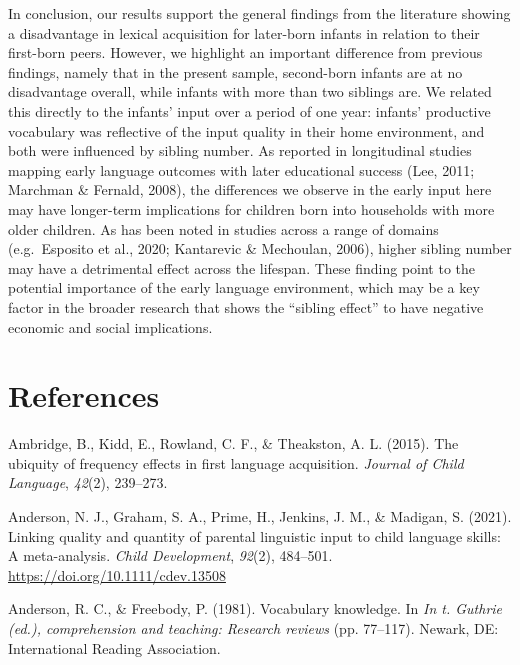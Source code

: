 \documentclass[
  english,
  man,floatsintext]{apa6}
\begin{document}
In conclusion, our results support the general findings from the literature showing a disadvantage in lexical acquisition for later-born infants in relation to their first-born peers. However, we highlight an important difference from previous findings, namely that in the present sample, second-born infants are at no disadvantage overall, while infants with more than two siblings are. We related this directly to the infants' input over a period of one year: infants' productive vocabulary was reflective of the input quality in their home environment, and both were influenced by sibling number. As reported in longitudinal studies mapping early language outcomes with later educational success (Lee, 2011; Marchman \& Fernald, 2008), the differences we observe in the early input here may have longer-term implications for children born into households with more older children. As has been noted in studies across a range of domains (e.g.~Esposito et al., 2020; Kantarevic \& Mechoulan, 2006), higher sibling number may have a detrimental effect across the lifespan. These finding point to the potential importance of the early language environment, which may be a key factor in the broader research that shows the \enquote{sibling effect} to have negative economic and social implications.

\newpage

\hypertarget{references}{%
\section{References}\label{references}}

\begingroup
\setlength{\parindent}{-0.5in}
\setlength{\leftskip}{0.5in}

\hypertarget{refs}{}
\leavevmode\hypertarget{ref-ambridge_ubiquity_2015}{}%
Ambridge, B., Kidd, E., Rowland, C. F., \& Theakston, A. L. (2015). The ubiquity of frequency effects in first language acquisition. \emph{Journal of Child Language}, \emph{42}(2), 239--273.

\leavevmode\hypertarget{ref-anderson_linking_2021}{}%
Anderson, N. J., Graham, S. A., Prime, H., Jenkins, J. M., \& Madigan, S. (2021). Linking quality and quantity of parental linguistic input to child language skills: A meta-analysis. \emph{Child Development}, \emph{92}(2), 484--501. \url{https://doi.org/10.1111/cdev.13508}

\leavevmode\hypertarget{ref-anderson_vocabulary_1981}{}%
Anderson, R. C., \& Freebody, P. (1981). Vocabulary knowledge. In \emph{In t. Guthrie (ed.), comprehension and teaching: Research reviews} (pp. 77--117). Newark, DE: International Reading Association.
\end{document}
